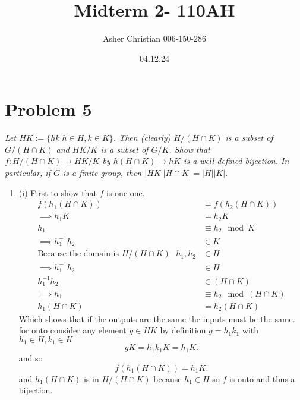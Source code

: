 \documentclass{article}
\title{Midterm 2- 110AH}
\author{Asher Christian 006-150-286}
\date{ 04.12.24}
\begin{document}
    \maketitle

    \section{Problem 5}
    \emph{Let $HK := \{hk | h \in H, k \in K\}$. Then (clearly) $H/(H \cap K)$ is a subset of $G/(H \cap K)$
    and $HK/K$ is a subset of $G/K$. Show that $f : H/(H \cap K) \rightarrow HK/K$ by $h(H \cap K)  \rightarrow
    hK$ is a well-defined bijection. In particular, if $G$ is a finite group, then $|HK||H \cap K| =
    |H||K|.$}\\
    \begin{enumerate}
        \item (i)
            First to show that $f$ is one-one.
            \begin{align*}
                f(h_1(H \cap K)) &= f(h_2(H \cap K)) \\ \implies
                h_1K &= h_2K\\
                h_1 &\equiv h_2 \mod K \\ \implies
                h_1^{-1}h_2 &\in K\\
                \text{Because the domain is $H / (H \cap K)$ } h_1, h_2 &\in H\\ \implies
                h_1^{-1}h_2 &\in H\\
                h_1^{-1}h_2 &\in (H \cap K) \\ \implies 
                h_1 &\equiv h_2 \mod (H \cap K)\\
                h_1(H \cap K) &= h_2(H \cap K)
            \end{align*}
            Which shows that if the outputs are the same the inputs must be the same.
            for onto consider any element $g \in HK$ by definition $g = h_1k_1$ with
            $h_1 \in H, k_1 \in K$
            \[
            gK = h_1k_1K = h_1K
            .\] 
            and so 
            \[
            f(h_1(H \cap K)) = h_1K
            .\] 
            and $h_1(H \cap K)$ is in $H / (H \cap K)$ because $h_1 \in H$ so $f$ is onto and thus a bijection.
            

\end{enumerate}
\end{document}
